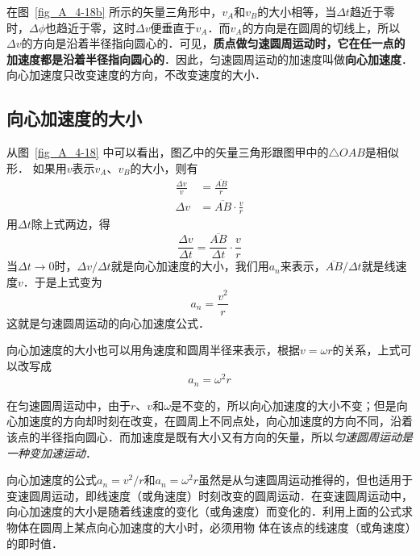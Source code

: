 在图~\ref{fig_A_4-18b} 所示的矢量三角形中，$v_A$和$v_B$的大小相等，当$\Delta t$趋近于零时，$\Delta \phi$也趋近于零，这时$\Delta v$便垂直于$v_A$．而$v_A$的方向是在圆周的切线上，所以$\Delta v$的方向是沿着半径指向圆心的．可见，\textbf{质点做匀速圆周运动时，它在任一点的加速度都是沿着半径指向圆心的}．因此，匀速圆周运动的加速度叫做\textbf{向心加速度}．向心加速度只改变速度的方向，不改变速度的大小．

\subsection{向心加速度的大小} 



从图~\ref{fig_A_4-18} 中可以看出，图乙中的矢量三角形跟图甲中的$\triangle OAB$是相似形．
如果用$v$表示$v_A$、$v_B$的大小，则有
\[\begin{split}
\frac{\Delta v}{v}&=\frac{\overline{AB}}{r}\\
\Delta v &= \overline{AB}\cdot \frac{v}{r}
\end{split} \]
用$\Delta t$除上式两边，得
\[\frac{\Delta v}{\Delta t}=\frac{\overline{AB}}{\Delta t}\cdot \frac{v}{r} \]
当$\Delta t\to 0$时，$\Delta v/\Delta t$就是向心加速度的大小，我们用$a_n$来表示，$\overline{AB}/\Delta t$就是线速度$v$．于是上式变为
\[a_n=\frac{v^2}{r} \]
这就是匀速圆周运动的向心加速度公式．

向心加速度的大小也可以用角速度和圆周半径来表示，根据$v=\omega r$的关系，上式可以改写成
\[a_n=\omega^2 r \]

在匀速圆周运动中，由于$r$、$v$和$\omega$是不变的，所以向心加速度的大小不变；但是向心加速度的方向却时刻在改变，在圆周上不同点处，向心加速度的方向不同，沿着该点的半径指向圆心．而加速度是既有大小又有方向的矢量，所以\textit{匀速圆周运动是一种变加速运动}．

向心加速度的公式$a_n=v^2/r$和$a_n=\omega^2 r$虽然是从匀速圆周运动推得的，但也适用于变速圆周运动，即线速度（或角速度）时刻改变的圆周运动．在变速圆周运动中，向心加速度的大小是随着线速度的变化（或角速度）而变化的．利用上面的公式求物体在圆周上某点向心加速度的大小时，必须用物
体在该点的线速度（或角速度）的即时值．

